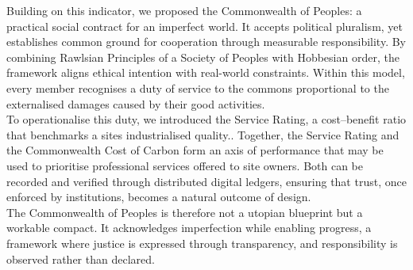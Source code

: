 \documentclass[12pt, oneside]{article}   	%
\begin{document}
Building on this indicator, we proposed the Commonwealth of Peoples: a practical social contract for an imperfect world.
It accepts political pluralism, yet establishes common ground for cooperation through measurable responsibility.
By combining Rawlsian Principles of a Society of Peoples with Hobbesian order, the framework aligns ethical intention with real-world constraints.
Within this model, every member recognises a duty of service to the commons proportional to the externalised damages caused by their good activities.\\

To operationalise this duty, we introduced the Service Rating, a cost–benefit ratio that benchmarks a sites industrialised quality..
Together, the Service Rating and the Commonwealth Cost of Carbon form an axis of performance that may be used to prioritise professional services offered to site owners.
Both can be recorded and verified through distributed digital ledgers, ensuring that trust, once enforced by institutions, becomes a natural outcome of design.\\

The Commonwealth of Peoples is therefore not a utopian blueprint but a workable compact.
It acknowledges imperfection while enabling progress, a framework where justice is expressed through transparency, and responsibility is observed rather than declared.\\
\end{document}
